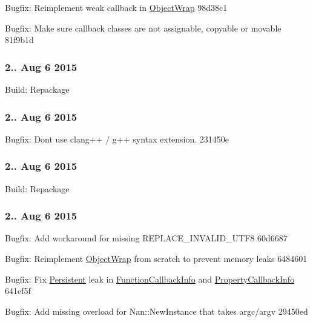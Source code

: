 \begin{DoxyItemize}
\item Bugfix\+: Reimplement weak callback in \hyperlink{class_object_wrap}{Object\+Wrap} 98d38c1
\item Bugfix\+: Make sure callback classes are not assignable, copyable or movable 81f9b1d
\end{DoxyItemize}

\subsubsection*{2.. Aug 6 2015}


\begin{DoxyItemize}
\item Build\+: Repackage
\end{DoxyItemize}

\subsubsection*{2.. Aug 6 2015}


\begin{DoxyItemize}
\item Bugfix\+: Don\textquotesingle{}t use clang++ / g++ syntax extension. 231450e
\end{DoxyItemize}

\subsubsection*{2.. Aug 6 2015}


\begin{DoxyItemize}
\item Build\+: Repackage
\end{DoxyItemize}

\subsubsection*{2.. Aug 6 2015}


\begin{DoxyItemize}
\item Bugfix\+: Add workaround for missing R\+E\+P\+L\+A\+C\+E\+\_\+\+I\+N\+V\+A\+L\+I\+D\+\_\+\+U\+T\+F8 60d6687
\item Bugfix\+: Reimplement \hyperlink{class_object_wrap}{Object\+Wrap} from scratch to prevent memory leaks 6484601
\item Bugfix\+: Fix \hyperlink{class_persistent}{Persistent} leak in \hyperlink{class_function_callback_info}{Function\+Callback\+Info} and \hyperlink{class_property_callback_info}{Property\+Callback\+Info} 641ef5f
\item Bugfix\+: Add missing overload for Nan\+::\+New\+Instance that takes argc/argv 29450ed
\end{DoxyItemize}

